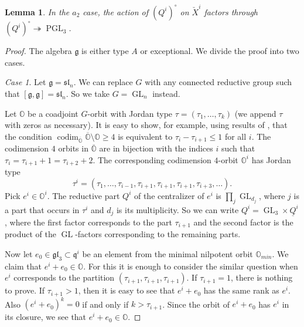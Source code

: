 \documentclass[12pt]{amsart}
\newcommand{\g}{\mathfrak{g}}
\newcommand{\Orb}{\mathbb{O}}
\newtheorem{Lem}[Thm]{Lemma}
\theoremstyle{definition}
\numberwithin{equation}{section}
\begin{document}
\begin{Lem}\label{Lem:Qi_action}
In the $a_2$ case, the action of $(Q^i)^\circ$ on $\check{X}^i$ factors through $(Q^i)^\circ\twoheadrightarrow
\operatorname{PGL}_3$.
\end{Lem} 
\begin{proof}
The algebra $\g$ is either type $A$ or exceptional. We divide the proof into two cases.

{\it Case 1}.
Let $\g=\mathfrak{sl}_n$. We can replace $G$ with any connected reductive group such that
$[\g,\g]=\mathfrak{sl}_n$. So we take $G=\operatorname{GL}_n$ instead.

Let $\Orb$ be a coadjoint $G$-orbit with Jordan type $\tau=(\tau_1,\ldots,\tau_k)$ (we append $\tau$
with zeros as necessary). It is easy to
show, for example, using results of \cite{KP1}, that the condition $\operatorname{codim}_{\overline{\Orb}}\overline{\Orb}\setminus \Orb\geqslant 4$ is equivalent to $\tau_i-\tau_{i+1}\leqslant 1$ for all $i$. The codimension $4$ orbits in $\overline{\Orb}$
are in bijection with the indices $i$ such that $\tau_i=\tau_{i+1}+1=\tau_{i+2}+2$.
The corresponding codimension $4$-orbit $\Orb^i$ has Jordan type $$\tau^i=(\tau_1,\ldots,\tau_{i-1},\tau_{i+1},\tau_{i+1},\tau_{i+1},\tau_{i+3},\ldots).$$
Pick $e^i\in \Orb^i$. The reductive part $Q^i$ of the centralizer of $e^i$ is
$\prod_j \operatorname{GL}_{d_j}$, where $j$ is a part that occurs in $\tau^i$
and $d_j$ is its multiplicity. So we can write $Q^i=\operatorname{GL}_3\times \underline{Q}^i$,
where the first factor corresponds to the part $\tau_{i+1}$ and the second factor is the product of
the $\operatorname{GL}$-factors corresponding to the remaining parts.

Now let $e_0\in \mathfrak{gl}_3\subset \mathfrak{q}^i$ be an element from the minimal nilpotent orbit
$\Orb_{min}$.  We claim that $e^i+e_0\in \Orb$. For this it is enough to consider the similar question
when $e^i$ corresponds to the partition $(\tau_{i+1},\tau_{i+1},\tau_{i+1})$. If $\tau_{i+1}=1$, there
is nothing to prove. If $\tau_{i+1}>1$, then it is easy to see that $e^i+e_0$ has the same rank as
$e^i$. Also $(e^i+e_0)^{k}=0$ if and only if $k>\tau_{i+1}$. Since the orbit of $e^i+e_0$ has
$e^i$ in its closure, we see that $e^i+e_0\in \Orb$.


\end{proof}
\end{document}
